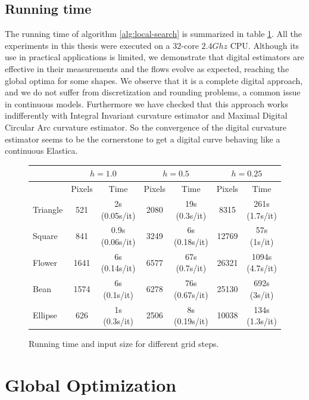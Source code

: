 \subsection{Running time}

The running time of algorithm \ref{alg:local-search} is summarized in table \ref{tab:summary-local-comb-rtime}. All the experiments in this thesis were executed on a $32$-core $2.4Ghz$ CPU. Although its use in practical applications is
limited, we demonstrate that digital estimators are effective in their measurements and the flows evolve as expected, reaching the global optima for some shapes. We
observe that it is a complete digital approach, and we do not suffer from discretization and rounding problems, a common
issue in continuous models.  Furthermore we have checked that this approach works indifferently with Integral Invariant
curvature estimator and Maximal Digital Circular Arc curvature estimator. So the convergence of the digital curvature
estimator seems to be the cornerstone to get a digital curve behaving like a continuous Elastica. 

\begin{figure}[h!]
\center
\captionsetup{type=table}
\begin{tabular}{|l|c|c|c|c|c|c|}
\hline
& \multicolumn{2}{c|}{$h=1.0$} & \multicolumn{2}{c|}{$h=0.5$} & \multicolumn{2}{c|}{$h=0.25$}\\
\hline
& Pixels & Time & Pixels & Time & Pixels & Time\\
\hline
Triangle & 521 & 2s (0.05s/it)  & 2080 & 19s (0.3s/it) & 8315 & 261s (1.7s/it)\\
Square & 841 & 0.9s (0.06s/it) & 3249 & 6s (0.18s/it) & 12769 & 57s (1s/it)\\
Flower & 1641 & 6s (0.14s/it) & 6577 & 67s (0.7s/it) & 26321 & 1094s (4.7s/it)\\
Bean  & 1574 & 6s (0.1s/it) & 6278 & 76s (0.67s/it) & 25130 & 692s (3s/it)\\
Ellipse  & 626 & 1s (0.3s/it) & 2506 & 8s (0.19s/it) & 10038 & 134s (1.3s/it)\\
\hline
\end{tabular}
\caption{Running time and input size for different grid steps.}
\label{tab:summary-local-comb-rtime} 
\end{figure}





\section{Global Optimization}\label{sec:global-optmization-model}

